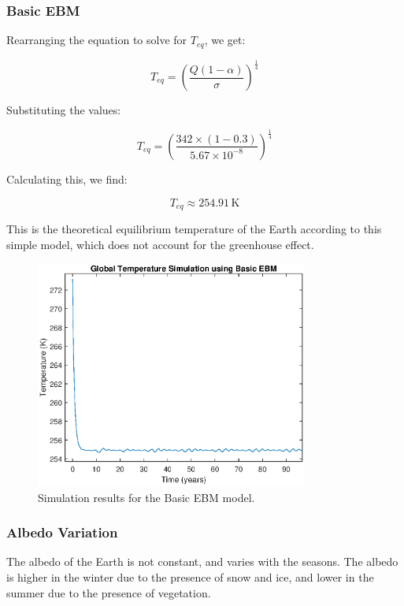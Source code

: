 \documentclass[12pt]{article}
\begin{document}
\subsubsection{Basic EBM}

Rearranging the equation to solve for $T_{eq}$, we get:

\begin{equation}
T_{eq} = \left( \frac{Q(1 - \alpha)}{\sigma} \right)^{\frac{1}{4}}
\end{equation}

Substituting the values:

\begin{equation}
T_{eq} = \left( \frac{342 \times (1 - 0.3)}{5.67 \times 10^{-8}} \right)^{\frac{1}{4}}
\end{equation}

Calculating this, we find:

\begin{equation}
T_{eq} \approx 254.91 \, \text{K}
\end{equation}

This is the theoretical equilibrium temperature of the Earth according to this simple model, which does not account for the greenhouse effect.


\begin{figure}[ht]
\centering
\includegraphics[width=0.8\textwidth]{images/ebm_basic.eps}
\caption{Simulation results for the Basic EBM model.}
\label{fig:basicEBM}
\end{figure}

\subsubsection{Albedo Variation}
The albedo of the Earth is not constant, 
and varies with the seasons. 
The albedo is higher in the winter due to the presence of snow and ice, 
and lower in the summer due to the presence of vegetation. 
\end{document}
